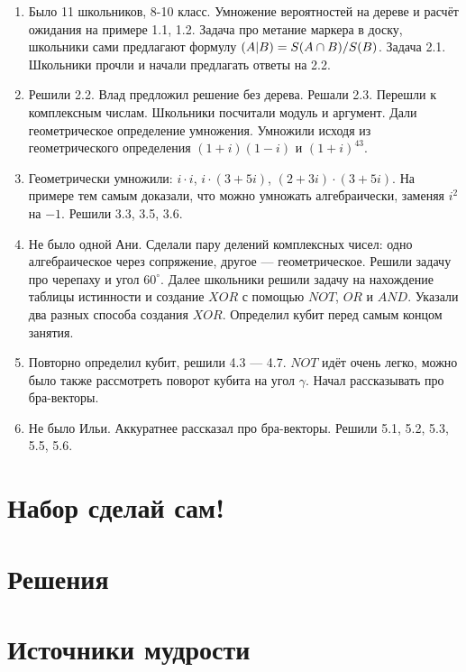 \documentclass[12pt]{article}
\let\P\relax
\DeclareMathOperator{\P}{\mathbb{P}}
\newcounter{problem}[section]
\theoremstyle{definition}
\begin{document}
\begin{enumerate}
  \item Было 11 школьников, 8-10 класс. Умножение вероятностей на дереве и расчёт ожидания на примере 1.1, 1.2.
  Задача про метание маркера в доску, школьники сами предлагают формулу $\P(A|B) = S(A\cap B) / S(B)$. Задача 2.1.
  Школьники прочли и начали предлагать ответы на 2.2.
  \item Решили 2.2. Влад предложил решение без дерева. Решали 2.3.
  Перешли к комплексным числам. Школьники посчитали модуль и аргумент.
  Дали геометрическое определение умножения. Умножили исходя
  из геометрического определения $(1+i)(1-i)$ и $(1+i)^{43}$.
  \item Геометрически умножили: $i\cdot i$, $i\cdot (3+5i)$, $(2+3i)\cdot (3+5i)$.
  На примере тем самым доказали, что можно умножать алгебраически, заменяя $i^2$ на $-1$.
  Решили 3.3, 3.5, 3.6.
  \item Не было одной Ани. Сделали пару делений комплексных чисел: одно алгебраическое через
  сопряжение, другое — геометрическое. Решили задачу про черепаху и угол $60^{\circ}$.
  Далее школьники решили задачу на нахождение таблицы истинности и создание $XOR$ с помощью $NOT$,
  $OR$ и $AND$. Указали два разных способа создания $XOR$. Определил кубит перед
  самым концом занятия.
  \item Повторно определил кубит, решили 4.3 — 4.7. $NOT$ идёт очень легко, можно
  было также рассмотреть поворот кубита на угол $\gamma$. Начал рассказывать
  про бра-векторы.
  \item Не было Ильи. Аккуратнее рассказал про бра-векторы. Решили 5.1, 5.2, 5.3, 5.5, 5.6.
\end{enumerate}




\renewenvironment{solution}[1]{%
         \vskip .5cm plus 2cm minus 0.1cm%
         {\bfseries \hyperlink{problem:#1}{#1.}}%
}%
{%
}%

\section{Набор сделай сам!}

\cite{stay2014deutch}

\section{Решения}



\section{Источники мудрости}
\printbibliography[heading=none]
\end{document}
